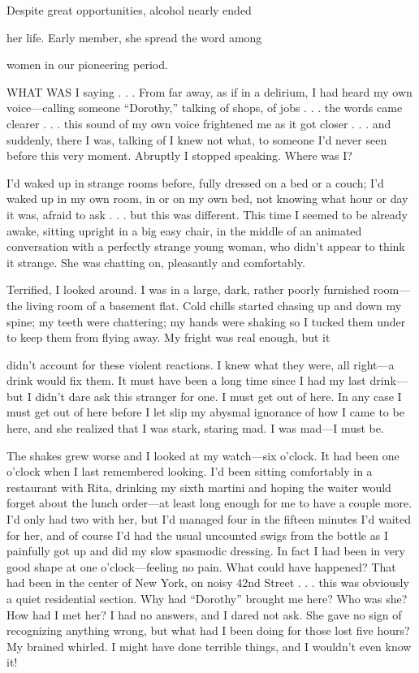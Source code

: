

\begin{biblechapter}

Despite great opportunities, alcohol nearly ended

her life. Early member, she spread the word among

women in our pioneering period.

      WHAT WAS I saying . . . From far away, as if in a delirium, I had heard my own voice—calling someone “Dorothy,” talking of shops, of jobs . . . the words came clearer . . . this sound of my own voice frightened me as it got closer . . . and suddenly, there I was, talking of I knew not what, to someone I’d never seen before this very moment. Abruptly I stopped speaking. Where was I?

I’d waked up in strange rooms before, fully dressed on a bed or a couch; I’d waked up in my own room, in or on my own bed, not knowing what hour or day it was, afraid to ask . . . but this was different. This time I seemed to be already awake, sitting upright in a big easy chair, in the middle of an animated conversation with a perfectly strange young woman, who didn’t appear to think it strange. She was chatting on, pleasantly and comfortably.

Terrified, I looked around. I was in a large, dark, rather poorly furnished room—the living room of a basement flat. Cold chills started chasing up and down my spine; my teeth were chattering; my hands were shaking so I tucked them under to keep them from flying away. My fright was real enough, but it

didn’t account for these violent reactions. I knew what they were, all right—a drink would fix them. It must have been a long time since I had my last drink—but I didn’t dare ask this stranger for one. I must get out of here. In any case I must get out of here before I let slip my abysmal ignorance of how I came to be here, and she realized that I was stark, staring mad. I was mad—I must be.

The shakes grew worse and I looked at my watch—six o’clock. It had been one o’clock when I last remembered looking. I’d been sitting comfortably in a restaurant with Rita, drinking my sixth martini and hoping the waiter would forget about the lunch order—at least long enough for me to have a couple more. I’d only had two with her, but I’d managed four in the fifteen minutes I’d waited for her, and of course I’d had the usual uncounted swigs from the bottle as I painfully got up and did my slow spasmodic dressing. In fact I had been in very good shape at one o’clock—feeling no pain. What could have happened? That had been in the center of New York, on noisy 42nd Street . . . this was obviously a quiet residential section. Why had “Dorothy” brought me here? Who was she? How had I met her? I had no answers, and I dared not ask. She gave no sign of recognizing anything wrong, but what had I been doing for those lost five hours? My brained whirled. I might have done terrible things, and I wouldn’t even know it!


\end{biblechapter}
